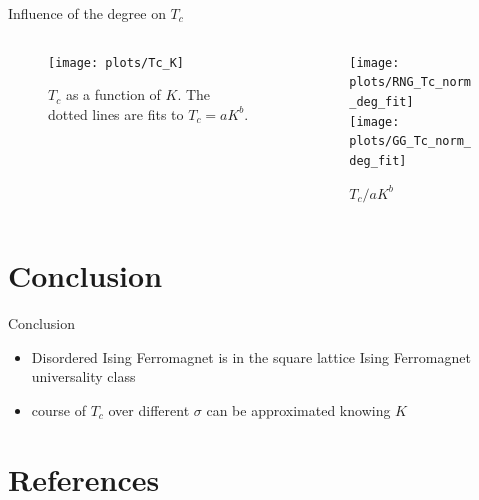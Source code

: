 \documentclass{beamer}
\begin{document}
        \begin{frame}{Influence of the degree on \(T_{c}\)}
            \begin{columns}[b]
                \begin{column}{0.7\textwidth}
                    \begin{figure}[htb]
                        \centering
                        \texttt{[image: plots/Tc\_K]}
                        \caption
                        {
                            \(T_c\) as a function of \(K\).
                            The dotted lines are fits to \(T_c = aK^b\).
                        }
                        \label{fig:Tc_K}
                    \end{figure}
                \end{column}
                \pause
                \begin{column}{0.3\textwidth}
                    \begin{figure}[htbp]
                        \centering
                        \subfigure
                        {
                            \label{sfig:Tc_norm_deg_fit:RNG}
                            \texttt{[image: plots/RNG\_Tc\_norm\_deg\_fit]}
                        }
                        \\
                        \subfigure
                        {
                            \label{sfig:Tc_norm_deg_fit:GG}
                            \texttt{[image: plots/GG\_Tc\_norm\_deg\_fit]}
                        }
                        \caption
                        {
                            \(T_c / aK^b\)
                        }
                        \label{fig:Tc_deg_fit}
                    \end{figure}
                \end{column}
            \end{columns}
        \end{frame}

\section{Conclusion}
    \begin{frame}{Conclusion}
        \begin{itemize}[<+->]
            \item Disordered Ising Ferromagnet is in the square lattice Ising Ferromagnet universality class
            \item course of \(T_{c}\) over different \(\sigma\) can be approximated knowing \(K\)
        \end{itemize}
    \end{frame}

\section{References}
    \begin{frame}[allowframebreaks]
        
        
    \end{frame}
\end{document}
